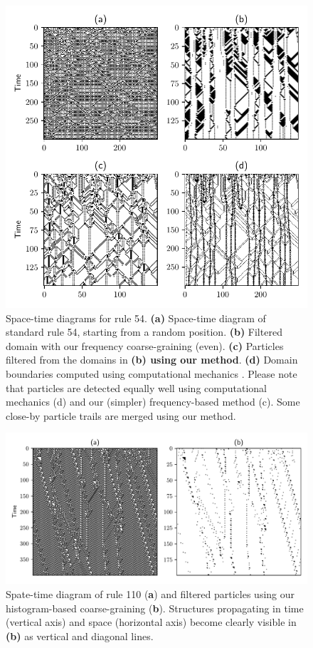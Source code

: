 \begin{figure}[htbp]
  \centering
  \includegraphics[width=\linewidth]{figures/rule54.pdf}
  \caption{\label{fig:rule54} Space-time diagrams for rule 54. \textbf{(a)}
    Space-time diagram of standard rule 54, starting from a random position.
    \textbf{(b)} Filtered domain with our frequency coarse-graining (even).
    \textbf{(c)} Particles filtered from the domains in \textbf{(b) using our
      method}. \textbf{(d)} Domain boundaries computed using computational
    mechanics \parencite{hansonComputationalMechanicsCellular1997}. Please note
    that particles are detected equally well using computational mechanics (d)
    and our (simpler) frequency-based method (c). Some close-by particle trails
    are merged using our method.}
\end{figure}

\begin{figure}[htbp]
  \centering
  \includegraphics[width=\linewidth]{figures/rule110.pdf}
  \caption{\label{fig:rule110} Spate-time diagram of rule 110 (\textbf{a}) and
    filtered particles using our histogram-based coarse-graining (\textbf{b}).
    Structures propagating in time (vertical axis) and space (horizontal axis)
    become clearly visible in \textbf{(b)} as vertical and diagonal lines.
  }
\end{figure}
